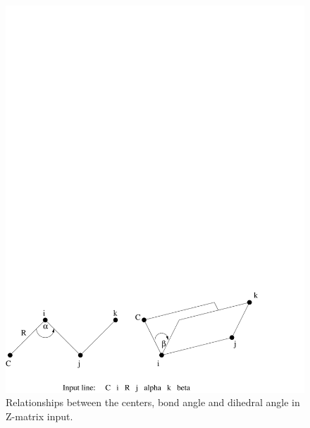 \begin{figure}[htbp]
\begin{latexonly}
\else
\includegraphics[angle=0,width=6in]{zmat1.pdf}
\fi
\end{latexonly}
\begin{htmlonly}
\end{htmlonly}
\caption{\label{fig:zmat1} Relationships between the centers, bond angle
and dihedral angle in Z-matrix input.}
\end{figure}

